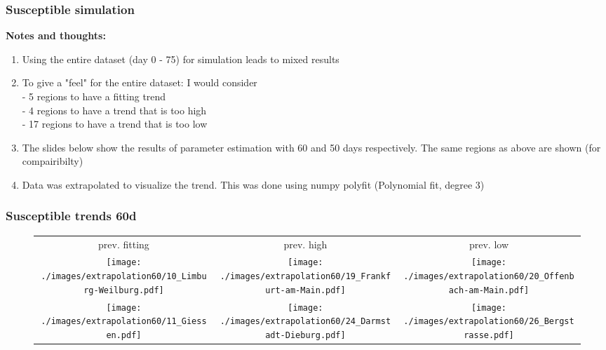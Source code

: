 \documentclass{beamer}
\begin{document}
\begin{frame}
	\frametitle{Susceptible simulation}
	\textbf{Notes and thoughts:}
	\begin{enumerate}[$\bullet$]
		\item Using the entire dataset (day 0 - 75) for simulation leads to mixed results
		\item To give a "feel" for the entire dataset: I would consider\\
			- 5 regions to have a fitting trend\\
			- 4 regions to have  a trend that is too high\\
			- 17 regions to have a trend that is too low
		\item The slides below show the results of parameter estimation with 60 and 50 days respectively. The same regions as above are shown (for compairibilty)
		\item Data was extrapolated to visualize the trend. This was done using numpy polyfit (Polynomial fit, degree 3)
	\end{enumerate}
\end{frame}

\begin{frame}
	\frametitle{Susceptible trends 60d}
	\begin{center}
		\begin{figure}
			\begin{adjustwidth}{-0.8cm}{}
			\begin{tabular}{ccc}
				prev. fitting & prev. high & prev. low \\
				\texttt{[image: ./images/extrapolation60/10\_Limburg-Weilburg.pdf]}
					& \texttt{[image: ./images/extrapolation60/19\_Frankfurt-am-Main.pdf]}
					& \texttt{[image: ./images/extrapolation60/20\_Offenbach-am-Main.pdf]} \\
				\texttt{[image: ./images/extrapolation60/11\_Giessen.pdf]}
					& \texttt{[image: ./images/extrapolation60/24\_Darmstadt-Dieburg.pdf]}
					& \texttt{[image: ./images/extrapolation60/26\_Bergstrasse.pdf]}
			\end{tabular}
			\end{adjustwidth}
		\end{figure}
	\end{center}
\end{frame}
\end{document}
